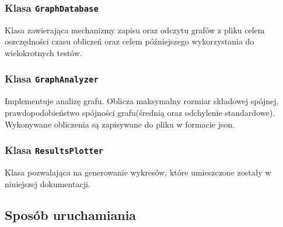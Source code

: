 		\subsubsection{Klasa \texttt{GraphDatabase}}
			Klasa zawierająca mechanizmy zapisu oraz odczytu grafów z pliku celem oszczędności czasu obliczeń oraz celem późniejszego wykorzystania do wielokrotnych testów.
		\subsubsection{Klasa \texttt{GraphAnalyzer}}
			Implementuje analizę grafu. Oblicza maksymalny rozmiar składowej spójnej, prawdopodobieństwo spójności grafu(średnią oraz odchylenie standardowe). Wykonywane obliczenia są zapisywane do pliku w formacie json.
		\subsubsection{Klasa \texttt{ResultsPlotter}}
			Klasa pozwalająca na generowanie wykresów, które umieszczone zostały w niniejszej dokumentacji.

	\subsection{Sposób uruchamiania}
		\label{final:struktura:uruchamianie}


